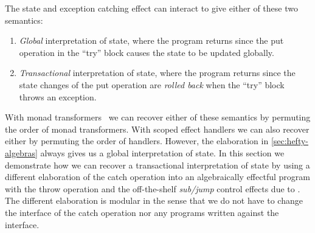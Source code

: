 The state and exception catching effect can interact to give either of these two semantics:
\begin{enumerate}
\item \emph{Global} interpretation of state, where the  program returns  since the \ac{put} operation in the ``try'' block causes the state to be updated globally.
\item \emph{Transactional} interpretation of state, where the  program returns  since the state changes of the \ac{put} operation are \emph{rolled back} when the ``try'' block throws an exception.
\end{enumerate}
%
With monad transformers~\cite{cenciarelli1993syntactic,Liang1995monad} we can recover either of these semantics by permuting the order of monad transformers.
With scoped effect handlers we can also recover either by permuting the order of handlers.
However, the  elaboration in \cref{sec:hefty-algebras} always gives us a global interpretation of state.
In this section we demonstrate how we can recover a transactional interpretation of state by using a different elaboration of the \ac{catch} operation into an algebraically effectful program with the \ac{throw} operation and the off-the-shelf \emph{sub/jump} control effects due to \citet{thielecke1997phd,DBLP:conf/csl/FioreS14}.
The different elaboration is modular in the sense that we do not have to change the interface of the catch operation nor any programs written against the interface.

